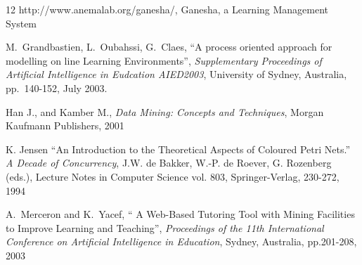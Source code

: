 \documentclass[10pt,twocolumn]{IEEEtran}
\begin{document}
\begin{thebibliography}{12}
http://www.anemalab.org/ganesha/,
Ganesha, a Learning Management System

M.~Grandbastien, L.~Oubahssi, G.~Claes, ``A process oriented approach
for modelling on line Learning Environments'', {\em Supplementary
Proceedings of Artificial Intelligence in Eudcation AIED2003},
University of Sydney, Australia, pp.~140-152, July 2003.


Han J.,  and Kamber M.,
{\it Data Mining: Concepts and Techniques},
Morgan Kaufmann Publishers, 2001


K. Jensen ``An Introduction to the Theoretical Aspects of Coloured Petri Nets.'' {\em A Decade of Concurrency}, J.W. de Bakker, W.-P. de Roever, G. Rozenberg (eds.), Lecture Notes in Computer
Science vol. 803, Springer-Verlag, 230-272, 1994








A.~Merceron  and K.~Yacef, ``
A Web-Based Tutoring Tool with Mining
Facilities to Improve Learning and Teaching'',
{\em Proceedings of the 11th International Conference
on Artificial Intelligence in Education}, Sydney, Australia, pp.201-208, 2003



\end{thebibliography}
\end{document}
